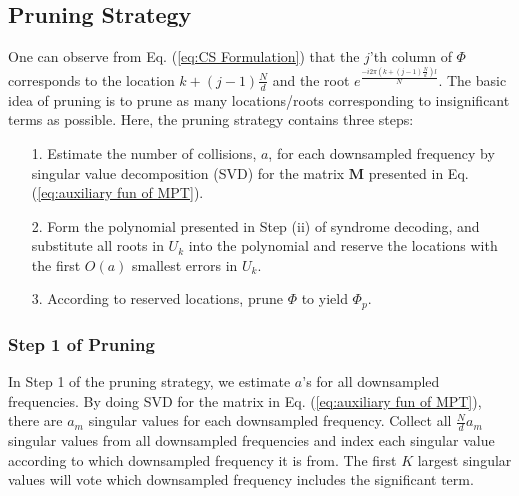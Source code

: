 \documentclass[journal,onecolumn,11pt]{IEEEtran}
\begin{document}
\subsection{Pruning Strategy}\label{Sec: decide a}
One can observe from Eq. (\ref{eq:CS Formulation}) that the $j$'th column of $\Phi$ corresponds to the location $k+(j-1)\frac{N}{d}$ and the root $e^{\frac{-i2\pi (k+(j-1)\frac{N}{d})l}{N}}$.
The basic idea of pruning is to prune as many locations/roots corresponding to insignificant terms as possible.
Here, the pruning strategy contains three steps:
\begin{itemize}
  \item[1.] Estimate the number of collisions, $a$, for each downsampled frequency by singular value decomposition (SVD) for the matrix $\bm{M}$ presented in Eq. (\ref{eq:auxiliary fun of MPT}).
  \item[2.] Form the polynomial presented in Step (ii) of syndrome decoding, and substitute all roots in $U_{k}$ into the polynomial and reserve the locations with the first $O(a)$ smallest errors in $U_{k}$.
  \item[3.] According to reserved locations, prune $\Phi$ to yield $\Phi_{p}$.
\end{itemize}

\subsubsection{Step 1 of Pruning}
In Step 1 of the pruning strategy, we estimate  $a$'s for all downsampled frequencies. By doing SVD for the matrix in Eq. (\ref{eq:auxiliary fun of MPT}), there are $a_{m}$ singular values for each downsampled frequency. Collect all $\frac{N}{d}a_{m}$ singular values from all downsampled frequencies and index each singular value according to which downsampled frequency it is from.
The first $K$ largest singular values will vote which downsampled frequency includes the significant term.
\end{document}

